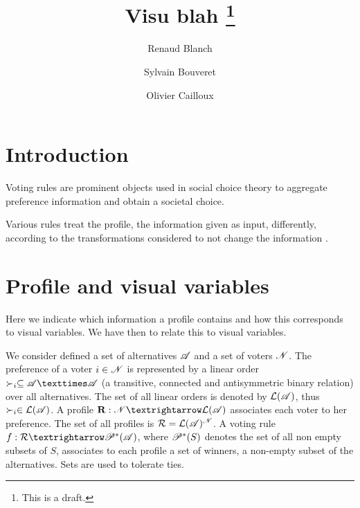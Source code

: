 \documentclass[version=last, pagesize, twoside=off, bibliography=totoc, DIV=calc, fontsize=12pt, a4paper, french, english]{scrartcl}
\begin{document}
\title{%
	\texorpdfstring{
		Visu blah%
		\thanks{
			This is a draft.
		}
	}{%
		Visu
	}
}
\author{Renaud Blanch}
\author{Sylvain Bouveret}
\author{Olivier Cailloux}
\maketitle

\section{Introduction}
\label{sec:intro}
Voting rules are prominent objects used in social choice theory to aggregate preference information and obtain a societal choice.

Various rules treat the profile, the information given as input, differently, according to the transformations considered to not change the information \citep{sen_social_1986, sen_informational_1974, sen_weights_1977, blackorby_social_1984}.

\section{Profile and visual variables}
Here we indicate which information a profile contains and how this corresponds to visual variables.
We have then to relate this to visual variables.

We consider defined a set of alternatives $\mathscr{A}$ and a set of voters $\mathscr{N}$. The preference of a voter $i \in \mathscr{N}$ is represented by a linear order $\pref_i \subseteq \allalts × \allalts$ (a transitive, connected and antisymmetric binary relation) over all alternatives. The set of all linear orders is denoted by $\mathcal{L}(\mathscr{A})$, thus $\succ_i \in \mathcal{L}(\mathscr{A})$. A profile $\prof: \allvoters → \linors$ associates each voter to her preference. The set of all profiles is $\mathcal{R} = \mathcal{L}(\mathscr{A})^{\mathscr{N}}$. A voting rule $f: \allprofs → \powersetz{\allalts}$, where $\mathscr{P}^*(S)$ denotes the set of all non empty subsets of $S$, associates to each profile a set of winners, a non-empty subset of the alternatives. Sets are used to tolerate ties.
\end{document}
